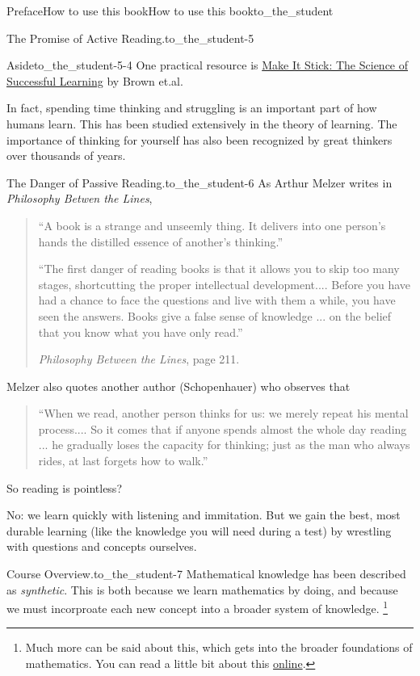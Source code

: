 \documentclass{tufte-book}
\numberwithin{equation}{chapter}
\begin{document}
\begin{preface}{Preface}{How to use this book}{}{How to use this book}{}{}{to_the_student}
\begin{paragraphs}{The Promise of Active Reading.}{to_the_student-5}
\begin{aside}{Aside}{}{to_the_student-5-4}%
One practical resource is \href{https://www.amazon.com/Make-Stick-Science-Successful-Learning/dp/0674729013}{Make It Stick: The Science of Successful Learning}\footnotemark{} by Brown et.al.%
\end{aside}
%
In fact, spending time thinking and struggling is an important part of how humans learn.  This has been studied extensively in the theory of learning. The importance of thinking for yourself has also been recognized by great thinkers over thousands of years.%
\end{paragraphs}%
\begin{paragraphs}{The Danger of Passive Reading.}{to_the_student-6}%
As Arthur Melzer writes in \emph{Philosophy Betwen the Lines},%
\begin{quote}%
``A book is a strange and unseemly thing.  It delivers into one person's hands the distilled essence of another's thinking.''%
\par
``The first danger of reading books is that it allows you to skip too many stages, shortcutting the proper intellectual development.... Before you have had a chance to face the questions and live with them a while, you have seen the answers. Books give a false sense of knowledge ... on the belief that you know what you have only read.''%
\par
\emph{Philosophy Between the Lines}, page 211.%
\end{quote}
Melzer also quotes another author (Schopenhauer) who observes that%
\begin{quote}%
``When we read, another person thinks for us: we merely repeat his mental process.... So it comes that if anyone spends almost the whole day reading ... he gradually loses the capacity for thinking; just as the man who always rides, at last forgets how to walk.''%
\end{quote}
So reading is pointless?%
\par
No: we learn quickly with listening and immitation. But we gain the best, most durable learning (like the knowledge you will need during a test) by wrestling with questions and concepts ourselves.%
\end{paragraphs}%
\begin{paragraphs}{Course Overview.}{to_the_student-7}%
Mathematical knowledge has been described as \emph{synthetic}. This is both because we learn mathematics by doing, and because we must incorproate each new concept into a broader system of knowledge. \footnote{Much more can be said about this, which gets into the broader foundations of mathematics.  You can read a little bit about this \href{https://en.wikipedia.org/wiki/Analytic\%E2\%80\%93synthetic_distinction}{online}.\label{to_the_student-7-2-2}}%

\end{paragraphs}
\end{preface}
\end{document}

